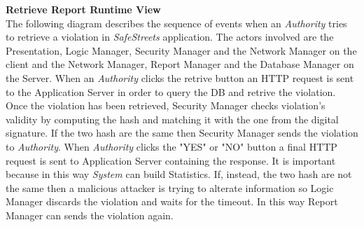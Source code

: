 \documentclass{article}
\begin{document}
\clearpage
\textbf{Retrieve Report Runtime View}\\
The following diagram describes the sequence of events when an \textit{Authority} tries to retrieve a violation in
\textit{SafeStreets} application. The actors involved are the Presentation, Logic Manager, Security Manager and 
the Network Manager on the client and the Network Manager, Report Manager and the Database Manager on the Server.
When an \textit{Authority} clicks the retrive button an HTTP request is sent to the Application Server in order to
query the DB and retrive the violation. Once the violation has been retrieved, Security Manager checks violation's 
validity by computing the hash and matching it with the one from the digital signature. If the two hash are the same then
Security Manager sends the violation to \textit{Authority}. When \textit{Authority} clicks the "YES" or "NO" button a final
HTTP request is sent to Application Server containing the response. It is important because in this way \textit{System} can
build Statistics. If, instead, the two hash are not the same then a malicious attacker is trying to alterate information so
Logic Manager discards the violation and waits for the timeout. In this way Report Manager can sends the violation again.     
\end{document}
